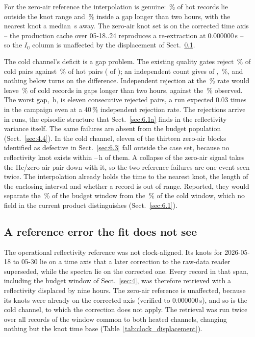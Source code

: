For the zero-air reference the interpolation is genuine: \,\% of hot records lie outside the knot range and
\,\% inside a gap longer than two hours, with the nearest knot a median \,s away. The zero-air knot set is on
the corrected time axis -- the production cache over 05-18..24 reproduces a re-extraction at 0.000000\,s -- so the
$I_0$ column is unaffected by the displacement of Sect.~\ref{sec:5.4}.

The cold channel's deficit is a gap problem. The existing quality gates reject \,\% of cold pairs against
\,\% of hot pairs ( of ); an independent count gives  of , \,\%, and nothing below turns on
the difference. Independent rejection at the \,\% rate would leave \,\% of cold records in gaps longer than two
hours, against the \,\% observed. The worst gap, \,h, is eleven consecutive rejected pairs, a run expected
0.03 times in the campaign even at a 40\,\% independent rejection rate. The rejections arrive in runs,
the episodic structure that Sect.~\ref{sec:6.1a} finds in the reflectivity variance itself. The same failures are absent
from the budget population (Sect.~\ref{sec:4.4}). In the cold channel, eleven of the thirteen zero-air blocks
identified as defective in Sect.~\ref{sec:6.3} fall outside the case set, because no reflectivity knot exists within
--\,h of them. A collapse of the zero-air signal takes the He/zero-air pair down with it, so
the two reference failures are one event seen twice. The interpolation already holds the time to the nearest knot, the length of the enclosing interval and whether a
record is out of range. Reported, they would separate the \,\% of the budget window from the \,\% of the cold
window, which no field in the current product distinguishes (Sect.~\ref{sec:6.1}).

\subsection{A reference error the fit does not see}
\label{sec:5.4}

The operational reflectivity reference was not clock-aligned. Its knots for 2026-05-18 to 05-30 lie on a time axis
that a later correction to the raw-data reader superseded, while the spectra lie on the corrected one. Every record in
that span, including the budget window of Sect.~\ref{sec:4}, was therefore retrieved with a reflectivity displaced by
nine hours. The zero-air reference is unaffected, because its knots were already on the corrected axis (verified to
0.000000\,s), and so is the cold channel, to which the correction does not apply. The retrieval was run twice over all
 records of the window common to both heated channels, changing nothing but the knot time base
(Table~\ref{tab:clock_displacement}).

